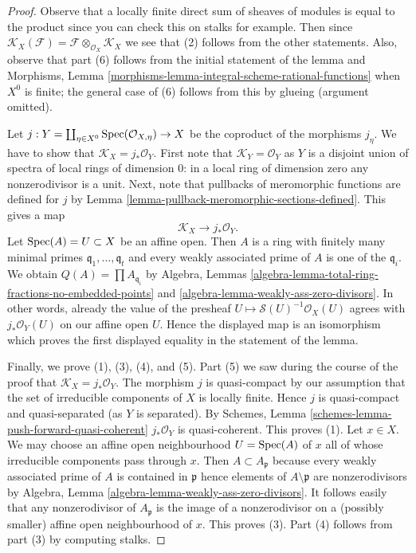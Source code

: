 \begin{proof}
Observe that a locally finite direct sum of sheaves of modules
is equal to the product since you can check this on stalks for
example. Then since $\mathcal{K}_X(\mathcal{F}) =
\mathcal{F} \otimes_{\mathcal{O}_X} \mathcal{K}_X$
we see that (2) follows from the other statements.
Also, observe that part (6) follows from the initial
statement of the lemma and Morphisms, Lemma
\ref{morphisms-lemma-integral-scheme-rational-functions}
when $X^0$ is finite; the general case of (6) follows from this
by glueing (argument omitted).

\medskip\noindent
Let $j : Y = \coprod\nolimits_{\eta \in X^0} \mathop{\mathrm{Spec}}(\mathcal{O}_{X, \eta}) \to X$
be the coproduct of the morphisms $j_\eta$. We have to show that
$\mathcal{K}_X = j_*\mathcal{O}_Y$.
First note that $\mathcal{K}_Y = \mathcal{O}_Y$ as $Y$ is a disjoint
union of spectra of local rings of dimension $0$: in a local
ring of dimension zero any nonzerodivisor is a unit.
Next, note that pullbacks of meromorphic
functions are defined for $j$ by
Lemma \ref{lemma-pullback-meromorphic-sections-defined}.
This gives a map
$$
\mathcal{K}_X \longrightarrow j_*\mathcal{O}_Y.
$$
Let $\mathop{\mathrm{Spec}}(A) = U \subset X$ be an affine open. Then $A$ is a ring
with finitely many minimal primes $\mathfrak q_1, \ldots, \mathfrak q_t$
and every weakly associated prime of $A$ is one of the $\mathfrak q_i$.
We obtain $Q(A) = \prod A_{\mathfrak q_i}$
by Algebra, Lemmas \ref{algebra-lemma-total-ring-fractions-no-embedded-points}
and \ref{algebra-lemma-weakly-ass-zero-divisors}.
In other words, already the value of the presheaf
$U \mapsto \mathcal{S}(U)^{-1}\mathcal{O}_X(U)$ agrees with
$j_*\mathcal{O}_Y(U)$ on our affine open $U$. Hence the displayed
map is an isomorphism which proves the first displayed equality in
the statement of the lemma.

\medskip\noindent
Finally, we prove (1), (3), (4), and (5).
Part (5) we saw during the course of the proof that
$\mathcal{K}_X = j_*\mathcal{O}_Y$.
The morphism $j$ is quasi-compact by our assumption
that the set of irreducible components of $X$ is locally finite.
Hence $j$ is quasi-compact and quasi-separated (as $Y$ is separated).
By Schemes, Lemma \ref{schemes-lemma-push-forward-quasi-coherent}
$j_*\mathcal{O}_Y$ is quasi-coherent. This proves (1).
Let $x \in X$. We may choose an affine open neighbourhood
$U = \mathop{\mathrm{Spec}}(A)$ of $x$ all of whose irreducible components
pass through $x$. Then $A \subset A_\mathfrak p$ because every
weakly associated prime of $A$ is contained in $\mathfrak p$
hence elements of $A \setminus \mathfrak p$ are nonzerodivisors
by Algebra, Lemma \ref{algebra-lemma-weakly-ass-zero-divisors}.
It follows easily that any nonzerodivisor of $A_\mathfrak p$
is the image of a nonzerodivisor on a (possibly smaller)
affine open neighbourhood of $x$. This proves (3).
Part (4) follows from part (3) by computing stalks.
\end{proof}

